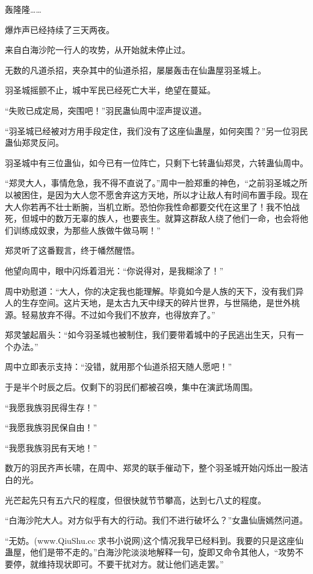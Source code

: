 
\begin{this_body}

轰隆隆……

爆炸声已经持续了三天两夜。

来自白海沙陀一行人的攻势，从开始就未停止过。

无数的凡道杀招，夹杂其中的仙道杀招，屡屡轰击在仙蛊屋羽圣城上。

羽圣城摇颤不止，城中军民已经死亡大半，绝望在蔓延。

“失败已成定局，突围吧！”羽民蛊仙周中涩声提议道。

“羽圣城已经被对方用手段定住，我们没有了这座仙蛊屋，如何突围？”另一位羽民蛊仙郑灵反问。

羽圣城中有三位蛊仙，如今已有一位阵亡，只剩下七转蛊仙郑灵，六转蛊仙周中。

“郑灵大人，事情危急，我不得不直说了。”周中一脸郑重的神色，“之前羽圣城之所以被困住，是因为大人您不愿舍弃这方天地，所以才让敌人有时间布置手段。现在大人你若再不壮士断腕，当机立断。恐怕你我性命都要交代在这里了！我不怕战死，但城中的数万无辜的族人，也要丧生。就算这群敌人绕了他们一命，也会将他们训练成奴隶，为那些人族做牛做马啊！”

郑灵听了这番觐言，终于幡然醒悟。

他望向周中，眼中闪烁着泪光：“你说得对，是我糊涂了！”

周中劝慰道：“大人，你的决定我也能理解。毕竟如今是人族的天下，没有我们异人的生存空间。这片天地，是太古九天中绿天的碎片世界，与世隔绝，是世外桃源。轻易放弃不得。不过如今我们不放弃，也得放弃了。”

郑灵皱起眉头：“如今羽圣城也被制住，我们要带着城中的子民逃出生天，只有一个办法。”

周中立即表示支持：“没错，就用那个仙道杀招天随人愿吧！”

于是半个时辰之后。仅剩下的羽民们都被召唤，集中在演武场周围。

“我愿我族羽民得生存！”

“我愿我族羽民保自由！”

“我愿我族羽民有天地！”

数万的羽民齐声长啸，在周中、郑灵的联手催动下，整个羽圣城开始闪烁出一股洁白的光。

光芒起先只有五六尺的程度，但很快就节节攀高，达到七八丈的程度。

“白海沙陀大人。对方似乎有大的行动。我们不进行破坏么？”女蛊仙唐嫣然问道。

“无妨。(www.QiuShu.cc 求书小说网)这个情况我早已经料到。我要的只是这座仙蛊屋，他们是带不走的。”白海沙陀淡淡地解释一句，旋即又命令其他人，“攻势不要停，就维持现状即可。不要干扰对方。就让他们逃走罢。”


\end{this_body}

